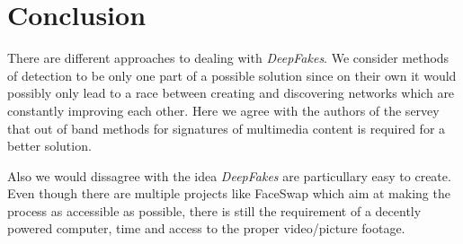\section{Conclusion}
There are different approaches to dealing with \textit{DeepFakes}.
We consider methods of detection to be only one part of a possible solution since
on their own it would possibly only lead to a race between creating and discovering
networks which are constantly improving each other.
Here we agree with the authors of the servey that out of band methods for 
signatures of multimedia content is required for a better solution.

Also we would dissagree with the idea \textit{DeepFakes} are particullary easy to create.
Even though there are multiple projects like FaceSwap which aim at making the
process as accessible as possible, there is still the requirement of a decently 
powered computer, time and access to the proper video/picture footage.